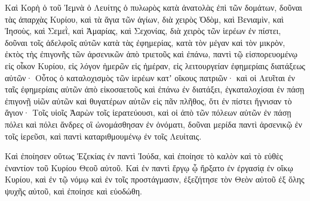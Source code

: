 {\par }{\PP {}Καὶ Κορὴ ὁ τοῦ Ἰεμνὰ ὁ Λευίτης ὁ πυλωρὸς κατὰ ἀνατολὰς ἐπὶ τῶν δομάτων, δοῦναι τὰς ἀπαρχὰς Κυρίου, καὶ τὰ ἅγια τῶν ἁγίων,
διὰ χειρὸς Ὀδὸμ, καὶ Βενιαμὶν, καὶ Ἰησοὺς, καὶ Σεμεῒ, καὶ Ἀμαρίας, καὶ Σεχονίας, διὰ χειρὸς τῶν ἱερέων ἐν πίστει, δοῦναι τοῖς ἀδελφοῖς αὐτῶν κατὰ τὰς ἐφημερίας, κατὰ τὸν μέγαν καὶ τὸν μικρὸν,
ἐκτὸς τὴς ἐπιγονῆς τῶν ἀρσενικῶν ἀπὸ τριετοῦς καὶ ἐπάνω, παντὶ τῷ εἰσπορευομένῳ εἰς οἶκον Κυρίου, εἰς λόγον ἡμερῶν εἰς ἡμέραν, εἰς λειτουργείαν ἐφημερίαις διατάξεως αὐτῶν·
Οὗτος ὁ καταλοχισμὸς τῶν ἱερέων κατʼ οἴκους πατριῶν· καὶ οἱ Λευῖται ἐν ταῖς ἐφημερίαις αὐτῶν ἀπὸ εἰκοσαετοῦς καὶ ἐπάνω ἐν διατάξει,
ἐγκαταλοχίσαι ἐν πάσῃ ἐπιγονῇ υἱῶν αὐτῶν καὶ θυγατέρων αὐτῶν εἰς πᾶν πλῆθος, ὅτι ἐν πίστει ἥγνισαν τὸ ἅγιον·
Τοῖς υἱοῖς Ἀαρὼν τοῖς ἱερατεύουσι, καὶ οἱ ἀπὸ τῶν πόλεων αὐτῶν ἐν πάσῃ πόλει καὶ πόλει ἄνδρες οἳ ὠνομάσθησαν ἐν ὀνόματι, δοῦναι μερίδα παντὶ ἀρσενικῷ ἐν τοῖς ἱερεῦσι, καὶ παντὶ καταριθμουμένῳ ἐν τοῖς Λευίταις.
\par }{\PP {}Καὶ ἐποίησεν οὕτως Ἐζεκίας ἐν παντὶ Ἰούδα, καὶ ἐποίησε τὸ καλὸν καὶ τὸ εὐθὲς ἐναντίον τοῦ Κυρίου Θεοῦ αὐτοῦ.
Καὶ ἐν παντὶ ἔργῳ ᾧ ἤρξατο ἐν ἐργασίᾳ ἐν οἴκῳ Κυρίου, καὶ ἐν τῷ νόμῳ καὶ ἐν τοῖς προστάγμασιν, ἐξεζήτησε τὸν Θεὸν αὐτοῦ ἐξ ὅλης ψυχῆς αὐτοῦ, καὶ ἐποίησε καὶ εὐοδώθη.

}
